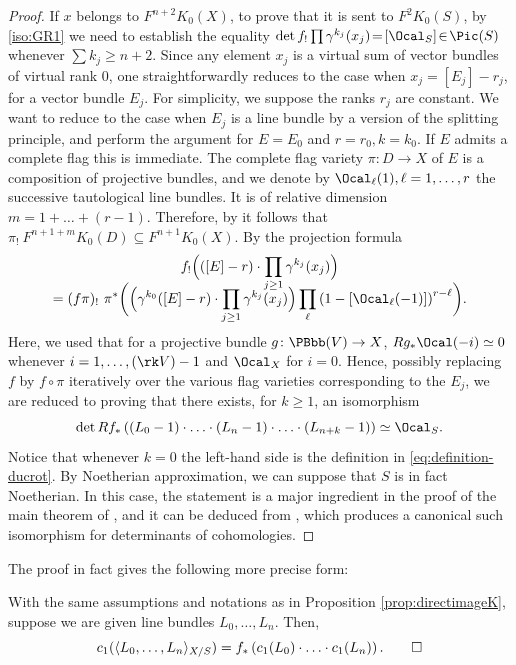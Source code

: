 \begin{proof}
If $x$ belongs to $F^{n+2}K_{0}(X)$, to prove that it is sent to $F^{2}K_{0}(S)$, by \eqref{iso:GR1} we need to establish the equality $\det f_!\prod \gamma^{k_j}(x_j)\!=\! [\Ocal_S] \!\in\! \Pic(S)$ whenever $\sum k_j \!\geq\! n+2$. Since any element $x_j$ is a virtual sum of vector bundles of virtual rank 0, one straightforwardly reduces to the case when $x_j = [E_j]-r_j$, for a vector bundle $E_j$. For simplicity, we suppose the ranks $r_j$ are constant. We want to reduce to the case when $E_j$ is a line bundle by a version of the splitting principle, and perform the argument for $E = E_0$ and $r=r_0, k = k_0$. If $E$ admits a complete flag this is immediate. The complete flag variety $\pi: D \to X$ of $E$ is a composition of projective bundles, and we denote by $\Ocal_\ell(1), \ell = 1, \ldots, r$ the successive tautological line bundles. It is of relative dimension $m=1+\ldots+(r-1)$. Therefore, by \cite[Exp.\,VI, Cor.\,5.8]{SGA6} it follows that $\pi_!\ F^{n+1+m} K_0(D) \subseteq F^{n+1}K_0(X)$. By the projection formula\vspace*{-3pt}
\begin{multline*}
f_! \Bigl(([E]-r) \cdot \prod_{j\geq 1} \gamma^{k_j}(x_j) \Bigr)\\[-10pt]
= ( f \pi)_!\ \pi^{\ast} \biggl(\Bigl(\gamma^{k_0}([E]-r) \cdot \prod_{j \geq 1} \gamma^{k_j}(x_j) \Bigr) \prod_\ell \left(1-[\Ocal_\ell(-1)]\right)^{r-\ell}\biggr).
\end{multline*}
Here, we used that for a projective bundle $g \colon \PBbb(V)\to X$, $Rg_\ast \Ocal(-i) \simeq 0$ whenever $i = 1, \ldots, (\rk V)-1$ and $\Ocal_X$ for $i = 0$. Hence, possibly replacing $f$ by $ f \circ \pi$ iteratively over the various flag varieties corresponding to the $E_j$, we are reduced to proving that there exists, for $k \geq 1$, an isomorphism
\begin{displaymath}
\det Rf_{\ast} \left( (L_0 -1)\cdot \ldots \cdot (L_n -1) \cdot \ldots \cdot (L_{n+k} -1)\right) \simeq \Ocal_S.
\end{displaymath}
Notice that whenever $k =0$ the left-hand side is the definition in \eqref{eq:definition-ducrot}. By Noetherian approximation, we can suppose that $S$ is in fact Noetherian. In this case, the statement is a major ingredient in the proof of the main theorem of \cite{Ducrot}, and it can be deduced from \cite[Prop.\,4.7.1]{Ducrot}, which produces a canonical such isomorphism for determinants of cohomologies.
\end{proof}
The proof in fact gives the following more precise form:
\begin{corollary}\label{cor:deligne-pairing-direct-image}
With the same assumptions and notations as in Proposition \ref{prop:directimageK}, suppose we are given line bundles $L_0, \ldots, L_n$. Then,
\begin{displaymath}
c_1(\langle L_0, \ldots, L_n \rangle_{X/S} )=f_\ast \left(c_{1}(L_0)\cdot \ldots\cdot c_{1}(L_n)\right).\qed
\end{displaymath}
\end{corollary}

